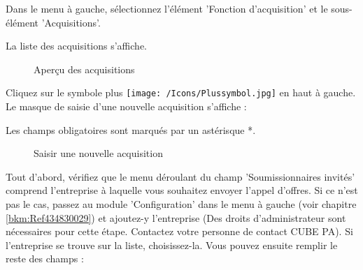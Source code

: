 Dans le menu à gauche, sélectionnez l'élément 'Fonction d'acquisition' et le sous-élément 'Acquisitions'. 

\vspace{5cm}

La liste des acquisitions s'affiche.

\vspace{2cm}

\begin{figure}[H]
\caption{Aperçu des acquisitions}
\end{figure}


Cliquez sur le symbole plus \texttt{[image: /Icons/Plussymbol.jpg]}  en haut à gauche. Le masque de saisie d'une nouvelle acquisition s'affiche :

\vspace{\baselineskip}

Les champs obligatoires sont marqués par un astérisque *.

\begin{figure}[H]
\caption{Saisir une nouvelle acquisition}
\end{figure}

Tout d'abord, vérifiez que le menu déroulant du champ 'Soumissionnaires invités'  comprend l'entreprise à laquelle vous souhaitez envoyer l'appel d'offres. Si ce n'est pas le cas, passez au module 'Configuration' dans le menu à gauche (voir chapitre \ref{bkm:Ref434830029}) et ajoutez-y l'entreprise (Des droits d'administrateur sont nécessaires pour cette étape. Contactez votre personne de contact CUBE PA). Si l'entreprise se trouve sur la liste, choisissez-la. Vous pouvez ensuite remplir le reste des champs :

\vspace{\baselineskip}

